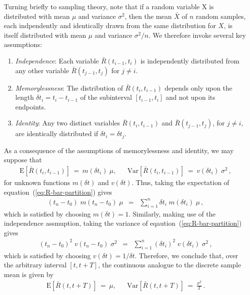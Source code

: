\documentclass[a4paper]{article}
\begin{document}
Turning briefly to sampling theory, note that if a random variable X
is distributed with mean $\mu$ and variance $\sigma^2$, then
the mean $\bar{X}$ of $n$ random samples, each indpendently and
identically drawn from the same distribution for $X$, 
is itself distributed with mean $\mu$
and variance $\sigma^2/n$.
We therefore invoke several key assumptions:
\begin{enumerate}
\item {\em Independence}: 
Each variable $\bar{R}(t_{i-1},t_{i})$ is independently distributed
from any other variable $\bar{R}(t_{j-1},t_{j})$ for $j\ne i$.

\item {\em Memorylessness}: The distribution of
$\bar{R}(t_i,t_{i-1})$ depends only 
upon the length
$\delta t_i=t_i-t_{i-1}$ of the subinterval $[t_{i-1},t_i]$ and not
upon its endpoints.

\item {\em Identity}: Any two distinct variables 
$\bar{R}(t_i,t_{i-1})$ and $\bar{R}(t_{j-1},t_{j})$, for $j\ne i$,
are identically distributed if $\delta t_i=\delta t_j$. 
\end{enumerate}
As a consequence of the assumptions of memorylessness and identity, 
we may suppose that
\begin{eqnarray}
\mbox{E}[\bar{R}(t_i,t_{i-1})]~=~m(\delta t_i)\;\mu, &&
\mbox{Var}[\bar{R}(t_i,t_{i-1})]~=~v(\delta t_i)\;\sigma^2\,,
\end{eqnarray}
for unknown functions $m(\delta t)$ and $v(\delta t)$.
Thus, taking the expectation of equation~(\ref{eq:R-bar-partition}) gives
\begin{eqnarray}
(t_n-t_0)\;m(t_n-t_0)\;\mu & = & 
\sum_{i=1}^{n}\delta t_i\;m(\delta t_i)\;\mu\,,
\end{eqnarray}
which is satisfied by choosing $m(\delta t)=1$.
Similarly, making use of the independence assmuption, taking the variance of eqaution~(\ref{eq:R-bar-partition})
gives
\begin{eqnarray}
(t_n-t_0)^2 \;v(t_n-t_0)\;\sigma^2 & = & 
\sum_{i=1}^{n}(\delta t_i)^2\;v(\delta t_i)\;\sigma^2\,,
\end{eqnarray}
which is satisfied by choosing $v(\delta t)=1/\delta t$. 
Therefore, we conclude that, over the arbitrary interval $[t,t+T]$, the continuous analogue to the discrete sample mean is given by
\begin{eqnarray}
\mbox{E}[\bar{R}(t,t+T)]~=~\mu, &&
\mbox{Var}[\bar{R}(t,t+T)]~=~\frac{\sigma^2}{T}\,.
\end{eqnarray}
\end{document}
